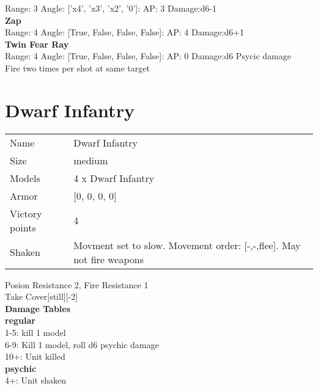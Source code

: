 Range: 3  Angle: ['x4', 'x3', 'x2', '0']: AP: 3 Damage:d6-1 \\




{\bf Zap } \\



Range: 4  Angle: [True, False, False, False]: AP: 4 Damage:d6+1 \\




{\bf Twin Fear Ray } \\



Range: 4  Angle: [True, False, False, False]: AP: 0 Damage:d6 Psycic damage \\
Fire two times per shot at same target\\ 




 















\pagebreak\pagebreak

\section{ Dwarf Infantry }

\begin{tabular}{ll}
  Name & Dwarf Infantry \\
  Size & medium\\
  Models & 4 x Dwarf Infantry\\
  Armor & [0, 0, 0, 0]\\
  Victory points & 4\\
  Shaken & Movment set to slow. Movement order: [-,-,flee]. May not fire weapons\\
\end{tabular}

Posion Resistance 2, Fire Resistance 1\\ 
Take Cover[still][-2]\\ 



{\bf Damage Tables} \\
 {\bf regular } \\
1-5: kill 1 model \\
6-9: Kill 1 model, roll d6 psychic damage \\
10+: Unit killed \\
 {\bf psychic } \\
4+: Unit shaken \\


